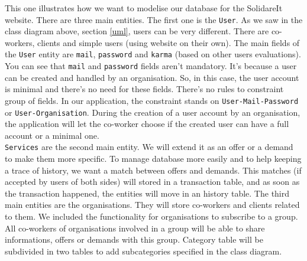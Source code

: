This one illustrates how we want to modelise our database for the SolidareIt website. There are three main entities. The first one is the \texttt{User}. As we saw in the class diagram above, section \vref{uml}, users can be very different. There are co-workers, clients and simple users (using website on their own). The main fields of the \texttt{User} entity are \texttt{mail}, \texttt{password} and \texttt{karma} (based on other users evaluations). You can see that \texttt{mail} and \texttt{password} fields aren't mandatory. It's because a user can be created and handled by an organisation. So, in this case, the user account is minimal and there's no need for these fields. There's no rules to constraint group of fields. In our application, the constraint stands on \texttt{User-Mail-Password} or \texttt{User-Organisation}. During the creation of a user account by an organisation, the application will let the co-worker choose if the created user can have a full account or a minimal one. \\
\texttt{Services} are the second main entity. We will extend it as an offer or a demand to make them more specific. To manage database more easily and to help keeping a trace of history, we want a match between offers and demands. This matches (if accepted by users of both sides) will stored in a transaction table, and as soon as the transaction happened, the entities will move in an history table. 
The third main entities are the organisations. They will store co-workers and clients related to them. We included the functionality for organisations to subscribe to a group. All co-workers of organisations involved in a group will be able to share informations, offers or demands with this group. Category table will be subdivided in two tables to add subcategories specified in the class diagram.
